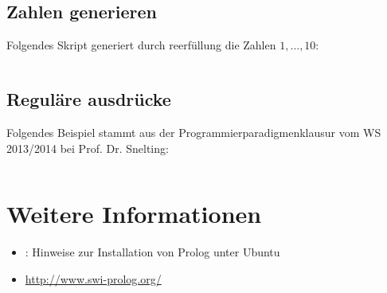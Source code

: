 

\subsection{Zahlen generieren}
Folgendes Skript generiert durch reerfüllung die Zahlen $1, \dots, 10$:

\inputminted[numbersep=5pt, tabsize=4]{prolog}{scripts/prolog/zahlen-bis-10.pl}

\subsection{Reguläre ausdrücke}
Folgendes Beispiel stammt aus der Programmierparadigmenklausur vom WS 2013/2014
bei Prof. Dr. Snelting:

\inputminted[numbersep=5pt, tabsize=4]{prolog}{scripts/prolog/regex.pl}

\section{Weitere Informationen}
\begin{itemize}
    \item \href{http://wiki.ubuntuusers.de/Prolog}{}: Hinweise zur Installation von Prolog unter Ubuntu
    \item \url{http://www.swi-prolog.org/}
\end{itemize}
